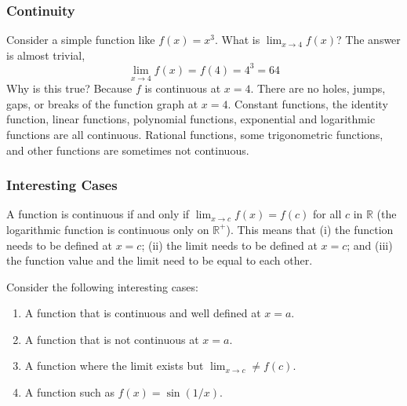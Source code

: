 \documentclass[xcolor=dvipsnames]{beamer}
\begin{document}
\begin{frame}
  \frametitle{Continuity}
Consider a simple function like $f(x)=x^{3}$. What is
$\lim_{x\rightarrow{}4}f(x)$? The answer is almost trivial,
\begin{equation}
  \label{eq:zaethahv}
  \lim_{x\rightarrow{}4}f(x)=f(4)=4^{3}=64
\end{equation}
Why is this true? Because $f$ is continuous at $x=4$. There are no
holes, jumps, gaps, or breaks of the function graph at $x=4$. 
Constant functions, the identity function, linear functions,
polynomial functions, exponential and logarithmic functions are all
continuous. Rational functions, some trigonometric functions, and
other functions are sometimes \alert{not} continuous.
\end{frame}

\begin{frame}
  \frametitle{Interesting Cases}
  A function is continuous if and only if
  $\lim_{x\rightarrow{}c}f(x)=f(c)$ for all $c$ in $\mathbb{R}$ (the
  logarithmic function is continuous only on $\mathbb{R}^{+}$).
  This means that (i) the function needs to be defined at $x=c$; (ii)
  the limit needs to be defined at $x=c$; and (iii) the function value
  and the limit need to be equal to each other.

Consider the following interesting cases:
\begin{enumerate}
\item<1-> A function that is continuous and well defined at $x=a$.
\item<2-> A function that is not continuous at $x=a$.
\item<3-> A function where the limit exists but $\lim_{x\rightarrow{}c}\neq{}f(c)$.
\item<4-> A function such as $f(x)=\sin(1/x)$.
\end{enumerate}
\end{frame}

\end{document}
